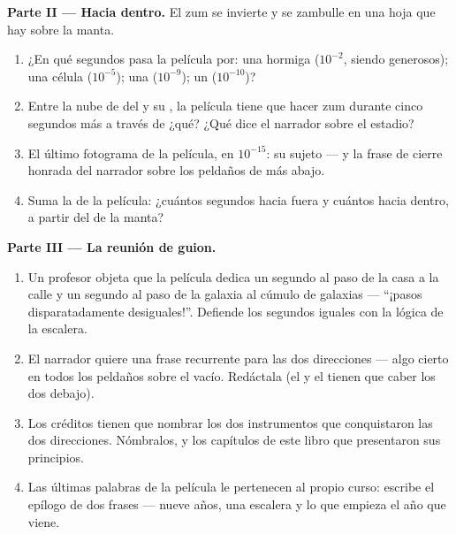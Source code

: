 \begin{problem}
\medskip\noindent\textbf{Parte II --- Hacia dentro.}
El zum se invierte y se zambulle en una hoja que hay sobre la manta.
\begin{enumerate}[resume]
  \item ¿En qué segundos pasa la película por: una hormiga
        ($10^{-2}$, siendo generosos); una célula ($10^{-5}$); una
         ($10^{-9}$); un  ($10^{-10}$)?
  \item Entre la nube de  del  y su
        , la película tiene que hacer zum durante cinco
        segundos más a través de ¿qué? ¿Qué dice el narrador sobre
        el estadio?
  \item El último fotograma de la película, en $10^{-15}$: su sujeto
        --- y la frase de cierre honrada del narrador sobre los
        peldaños de más abajo.
  \item Suma la  de la película: ¿cuántos segundos hacia
        fuera y cuántos hacia dentro, a partir del  de la
        manta?
\end{enumerate}

\medskip\noindent\textbf{Parte III --- La reunión de guion.}
\begin{enumerate}[resume]
  \item Un profesor objeta que la película dedica un segundo al paso
        de la casa a la calle y un segundo al paso de la galaxia al
        cúmulo de galaxias --- ``¡pasos disparatadamente
        desiguales!''. Defiende los segundos iguales con la lógica de
        la escalera.
  \item El narrador quiere una frase recurrente para las dos
        direcciones --- algo cierto en todos los peldaños sobre el
        vacío. Redáctala (el  y el 
        tienen que caber los dos debajo).
  \item Los créditos tienen que nombrar los dos instrumentos que
        conquistaron las dos direcciones. Nómbralos, y los capítulos
        de este libro que presentaron sus principios.
  \item Las últimas palabras de la película le pertenecen al propio
        curso: escribe el epílogo de dos frases --- nueve años, una
        escalera y lo que empieza el año que viene.
\end{enumerate}
\end{problem}
